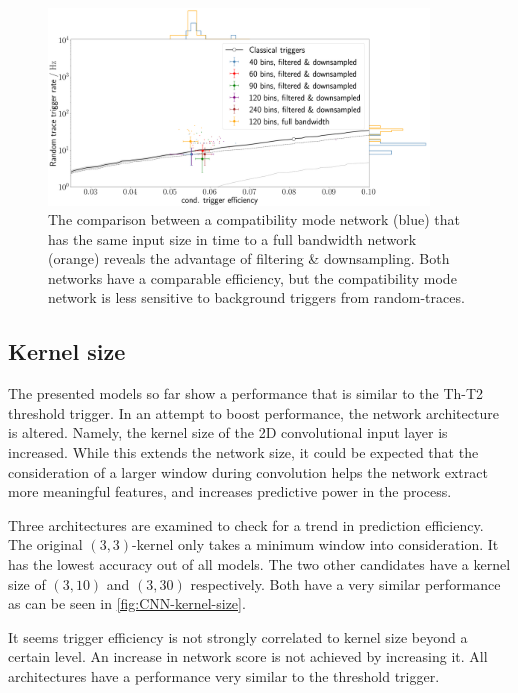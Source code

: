 \begin{figure}
	\centering
	\includegraphics[width=0.9\textwidth]{./plots/CNN_input_size.png}
	\caption{The comparison between a compatibility mode network (blue) that has the same input size in time to a full bandwidth network (orange) reveals the 
	advantage of filtering \& downsampling. Both networks have a comparable efficiency, but the compatibility mode network is less sensitive to background
	triggers from random-traces.}
	\label{fig:CNN-input-size}
\end{figure}

\subsection{Kernel size}
\label{ssec:kernel-size}

The presented models so far show a performance that is similar to the Th-T2 threshold trigger. In an attempt to boost performance, the network architecture is 
altered. Namely, the kernel size of the 2D convolutional input layer is increased. While this extends the network size, it could be expected that the 
consideration of a larger window during convolution helps the network extract more meaningful features, and increases predictive power in the process.

Three architectures are examined to check for a trend in prediction efficiency. The original $(3, 3)$-kernel only takes a minimum window into consideration. 
It has the lowest accuracy out of all models. The two other candidates have a kernel size of $(3, 10)$ and $(3, 30)$ respectively. Both have a very similar 
performance as can be seen in \autoref{fig:CNN-kernel-size}. 

It seems trigger efficiency is not strongly correlated to kernel size beyond a certain level. An increase in network score is not achieved by increasing it. 
All architectures have a performance very similar to the threshold trigger.

